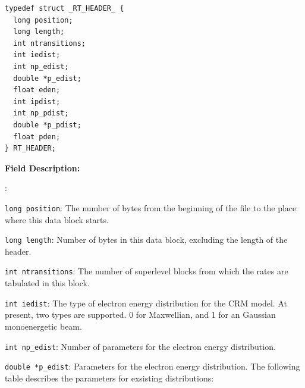 \documentclass[twoside,letterpaper]{refrep}
\newenvironment{dbdesc}{\textbf{Field Description:} \begin{list}
	{:}{\setlength{\labelwidth}{2in}
	   \setlength{\leftmargin}{2in}
	   \setlength{\labelsep}{0.1in}
	   \setlength{\rightmargin}{0.2in}}}
	{\end{list}}
\begin{document}
\begin{verbatim}
typedef struct _RT_HEADER_ { 
  long position;
  long length;
  int ntransitions;
  int iedist;
  int np_edist;
  double *p_edist;
  float eden;
  int ipdist;
  int np_pdist;
  double *p_pdist;
  float pden;
} RT_HEADER;
\end{verbatim}

\begin{dbdesc}
\item[\texttt{long position}:] The number of bytes from the beginning of the
file to the place where this data block starts.
\item[\texttt{long length}:] Number of bytes in this data block, excluding the
length of the header.
\item[\texttt{int ntransitions}:] The number of superlevel blocks from which
the rates are tabulated in this block.
\item[\texttt{int iedist}:] The type of electron energy distribution for the
CRM model. At present, two types are supported. 0 for Maxwellian, and 1 for an
Gaussian monoenergetic beam.
\item[\texttt{int np\_edist}:] Number of parameters for the electron energy
distribution.
\item[\texttt{double *p\_edist}:] Parameters for the electron energy
distribution. The following table describes the parameters for exsisting
distributions:


\end{dbdesc}
\end{document}
